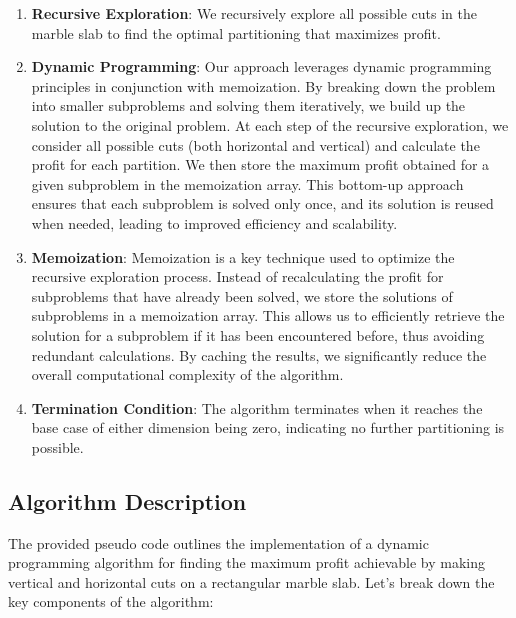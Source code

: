 \documentclass{article}
\begin{document}
\begin{enumerate}
    \item \textbf{Recursive Exploration}: We recursively explore all possible cuts in the marble slab to find the optimal partitioning that maximizes profit.
    
        \item \textbf{Dynamic Programming}: Our approach leverages dynamic programming principles in conjunction with memoization. By breaking down the problem into smaller subproblems and solving them iteratively, we build up the solution to the original problem. At each step of the recursive exploration, we consider all possible cuts (both horizontal and vertical) and calculate the profit for each partition. We then store the maximum profit obtained for a given subproblem in the memoization array. This bottom-up approach ensures that each subproblem is solved only once, and its solution is reused when needed, leading to improved efficiency and scalability.

    \item \textbf{Memoization}: Memoization is a key technique used to optimize the recursive exploration process. Instead of recalculating the profit for subproblems that have already been solved, we store the solutions of subproblems in a memoization array. This allows us to efficiently retrieve the solution for a subproblem if it has been encountered before, thus avoiding redundant calculations. By caching the results, we significantly reduce the overall computational complexity of the algorithm.
    
    \item \textbf{Termination Condition}: The algorithm terminates when it reaches the base case of either dimension being zero, indicating no further partitioning is possible.
\end{enumerate}


\subsection{Algorithm Description}

The provided pseudo code outlines the implementation of a dynamic programming algorithm for finding the maximum profit achievable by making vertical and horizontal cuts on a rectangular marble slab. Let's break down the key components of the algorithm:
\end{document}

